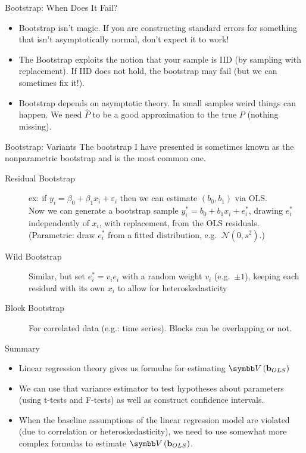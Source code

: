 \documentclass[aspectratio=169,11pt]{beamer}
\begin{document}
\begin{frame}{Bootstrap: When Does It Fail?}
\begin{itemize}
\item Bootstrap isn't magic. If you are constructing standard errors for something that isn't asymptotically normal, don't expect it to work!
\item The Bootstrap exploits the notion that your sample is IID (by sampling with replacement). If IID does not hold, the bootstrap may fail (but we can sometimes fix it!).
\item Bootstrap depends on asymptotic theory. In small samples weird things can happen. We need $\hat{P}$ to be a good approximation to the true $P$ (nothing missing).
\end{itemize}
\end{frame}

\begin{frame}{Bootstrap: Variants}
The bootstrap I have presented is sometimes known as the \alert{nonparametric bootstrap} and is the most common one.
\begin{description}
\item[Residual Bootstrap] ex: if $y_i = \beta_0 + \beta_1 x_i + \varepsilon_i$ then we can estimate $(b_0,b_1)$ via OLS.\\
 Now we can generate a bootstrap sample $y_i^{*} = b_0 + b_1 x_i + e_i^{*}$, drawing $e_i^{*}$ \alert{independently} of $x_i$, with replacement, from the OLS residuals. (\alert{Parametric}: draw $e_i^{*}$ from a fitted distribution, e.g.\ $\mathcal{N}(0,s^2)$.)
 \item[Wild Bootstrap] Similar, but set $e_i^{*} = v_i e_i$ with a random weight $v_i$ (e.g.\ $\pm 1$), keeping each residual with its own $x_i$ to allow for \alert{heteroskedasticity}
\item[Block Bootstrap] For correlated data (e.g.: time series). Blocks can be overlapping or not.  
\end{description}
\end{frame}


\begin{frame}{Summary}
\begin{itemize}
	\item Linear regression theory gives us formulas for estimating $\Var\left({\bf b}_{OLS}\right)$

	\item We can use that variance estimator to test hypotheses about parameters (using t-tests
	and F-tests) as well as construct confidence intervals. 

	\item When the baseline assumptions of the linear regression model are violated (due to
	correlation or heteroskedasticity), we need to use somewhat more complex formulas
	to estimate  $\Var\left({\bf b}_{OLS}\right)$.

\end{itemize}
\end{frame}
\end{document}
